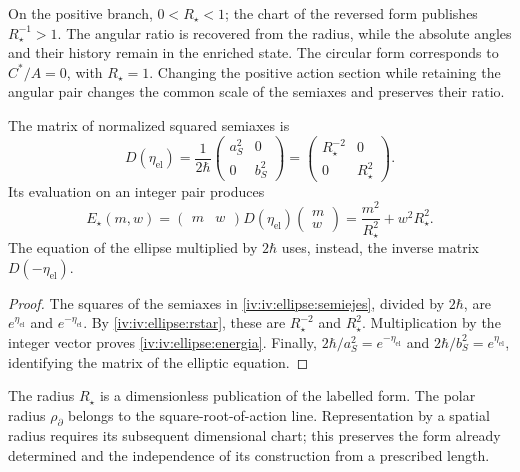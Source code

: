 On the positive branch, \(0<R_\star<1\); the chart of the
reversed form publishes \(R_\star^{-1}>1\). The angular ratio
is recovered from the radius, while the absolute angles
and their history remain in the enriched state.
The circular form corresponds to \(C^*/A=0\), with
\(R_\star=1\). Changing the positive action section
while retaining the angular pair changes the common scale of
the semiaxes and preserves their ratio.

\begin{proposition}
\label{iv:iv:ellipse:matriz-prop}
The matrix of normalized squared semiaxes is
\begin{equation}
 D(\eta_{\mathrm{el}})
 =\frac1{2\hbar}
    \begin{pmatrix}a_S^2&0\\0&b_S^2\end{pmatrix}
 =\begin{pmatrix}R_\star^{-2}&0\\0&R_\star^2\end{pmatrix}.
 \label{iv:iv:ellipse:matriz}
\end{equation}
Its evaluation on an integer pair produces
\begin{equation}
 E_\star(m,w)=
 \begin{pmatrix}m&w\end{pmatrix}
 D(\eta_{\mathrm{el}})
 \begin{pmatrix}m\\w\end{pmatrix}
 =\frac{m^2}{R_\star^2}+w^2R_\star^2.
 \label{iv:iv:ellipse:energia}
\end{equation}
The equation of the ellipse multiplied by \(2\hbar\)
uses, instead, the inverse matrix \(D(-\eta_{\mathrm{el}})\).
\end{proposition}
\begin{proof}
The squares of the semiaxes in
\eqref{iv:iv:ellipse:semiejes}, divided by \(2\hbar\),
are \(e^{\eta_{\mathrm{el}}}\) and
\(e^{-\eta_{\mathrm{el}}}\).
By \eqref{iv:iv:ellipse:rstar}, these are
\(R_\star^{-2}\) and \(R_\star^2\).
Multiplication by the integer vector proves
\eqref{iv:iv:ellipse:energia}. Finally,
\(2\hbar/a_S^2=e^{-\eta_{\mathrm{el}}}\) and
\(2\hbar/b_S^2=e^{\eta_{\mathrm{el}}}\), identifying
the matrix of the elliptic equation.
\end{proof}

The radius \(R_\star\) is a dimensionless publication of
the labelled form. The polar radius
\(\rho_{\partial}\) belongs to the square-root-of-action line.
Representation by a spatial radius requires its subsequent
dimensional chart; this preserves the form already determined
and the independence of its construction from a
prescribed length.
